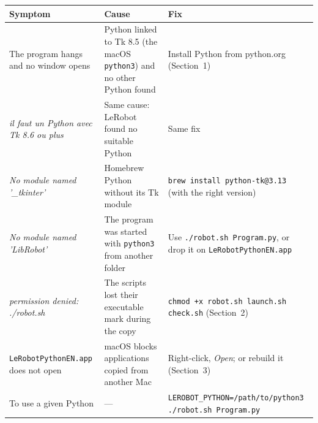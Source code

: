 \documentclass[11pt,a4paper]{article}
\newcommand{\kbd}[1]{\texttt{#1}}
\begin{document}
\begin{tabularx}{\textwidth}{@{}LLL@{}}
\toprule
\textbf{Symptom} & \textbf{Cause} & \textbf{Fix} \\
\midrule
The program hangs and no window opens & Python linked to Tk 8.5 (the macOS \kbd{python3}) and no other Python found & Install Python from python.org (Section~1) \\
\addlinespace
\emph{il faut un Python avec Tk 8.6 ou plus} & Same cause: LeRobot found no suitable Python & Same fix \\
\addlinespace
\emph{No module named '\_tkinter'} & Homebrew Python without its Tk module & \kbd{brew install python-tk@3.13} (with the right version) \\
\addlinespace
\emph{No module named 'LibRobot'} & The program was started with \kbd{python3} from another folder & Use \kbd{./robot.sh Program.py}, or drop it on \kbd{LeRobotPythonEN.app} \\
\addlinespace
\emph{permission denied: ./robot.sh} & The scripts lost their executable mark during the copy & \kbd{chmod +x robot.sh launch.sh check.sh} (Section~2) \\
\addlinespace
\kbd{LeRobotPythonEN.app} does not open & macOS blocks applications copied from another Mac & Right-click, \emph{Open}; or rebuild it (Section~3) \\
\addlinespace
To use a given Python & --- & \kbd{LEROBOT\_PYTHON=\allowbreak /path/\allowbreak to/\allowbreak python3 \allowbreak ./robot.sh Program.py} \\
\bottomrule
\end{tabularx}
\end{document}
